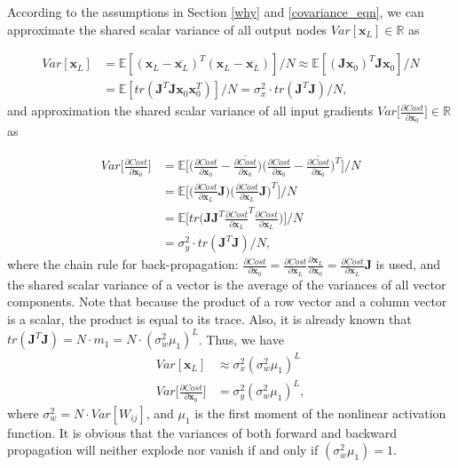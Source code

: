According to the assumptions in Section \ref{why} and  \eqref{covariance_eqn},
we can approximate the shared scalar variance of all output nodes $Var[\mathbf{x}_L]\in\mathbb{R}$ as

\begin{equation}
    \begin{aligned}
    Var[\mathbf{x}_L] &=\mathbb{E}[(\mathbf{x}_L-\overline{\mathbf{x}_L})^T(\mathbf{x}_L-\overline{\mathbf{x}_L})]/N
    \approx \mathbb{E}[(\mathbf{Jx}_0)^T\mathbf{Jx}_0]/N\\
    &=\mathbb{E}[tr(\mathbf{J}^T\mathbf{J}\mathbf{x}_0\mathbf{x}_0^T)]/N
    =\sigma_x^2\cdot tr(\mathbf{J}^T\mathbf{J})/N,
    \label{xvar_to_trace}
    \end{aligned}
\end{equation}
and approximation the shared scalar variance of all input gradients $Var\Big[\frac{\partial Cost}{\partial \mathbf{x}_0}\Big]\in\mathbb{R}$ as

\begin{equation}
    \begin{aligned}
    Var\Big[\frac{\partial Cost}{\partial \mathbf{x}_0}\Big]
    &=\mathbb{E}\Big[\Big(\frac{\partial Cost}{\partial \mathbf{x}_0}-\overline{\frac{\partial Cost}{\partial \mathbf{x}_0}}\Big)
    \Big(\frac{\partial Cost}{\partial \mathbf{x}_0}-\overline{\frac{\partial Cost}{\partial \mathbf{x}_0}}\Big)^T\Big]\Big/N
    \\
    &= \mathbb{E}\Big[
    \Big(\frac{\partial Cost}{\partial \mathbf{x}_L}\mathbf{J}\Big)
    \Big(\frac{\partial Cost}{\partial \mathbf{x}_L}\mathbf{J}\Big)^T\Big]\Big/N
    \\
    &=\mathbb{E}\Big[tr\Big(\mathbf{J}\mathbf{J}^T\frac{\partial Cost}{\partial \mathbf{x}_L}^T\frac{\partial Cost}{\partial \mathbf{x}_L}\Big)\Big]/N
    \\
    &=\sigma_y^2\cdot tr(\mathbf{J}^T\mathbf{J})/N,
    \end{aligned}
    \label{yvar_to_trace}
\end{equation}
where the chain rule for back-propagation: $\frac{\partial Cost}{\partial \mathbf{x}_0}=\frac{\partial Cost}{\partial \mathbf{x}_L}\frac{\partial \mathbf{x}_L}{\partial \mathbf{x}_0}=\frac{\partial Cost}{\partial \mathbf{x}_L}\mathbf{J}$ is used, and the shared scalar variance of a vector is the average of the variances of all vector components.
Note that because the product of a row vector and a column vector is a scalar, the product is equal to its trace. Also, it is already known that
$tr(\mathbf{J}^T\mathbf{J})=N\cdot m_1=N\cdot(\sigma_w^2\mu_1)^L$. Thus, we have
\begin{equation}
    \begin{aligned}
    Var[\mathbf{x}_L]&\approx\sigma_x^2(\sigma_w^2\mu_1)^L\\
    Var\Big[\frac{\partial Cost}{\partial \mathbf{x}_0}\Big]&=\sigma_y^2(\sigma_w^2\mu_1)^L,
    \end{aligned}
\end{equation}
where $\sigma_w^2=N\cdot Var[W_{ij}]$, and $\mu_1$ is the first moment of the nonlinear activation function. It is obvious that the variances of
both forward and backward propagation will neither explode nor vanish if and only if
$(\sigma_w^2\mu_1)=1$.

